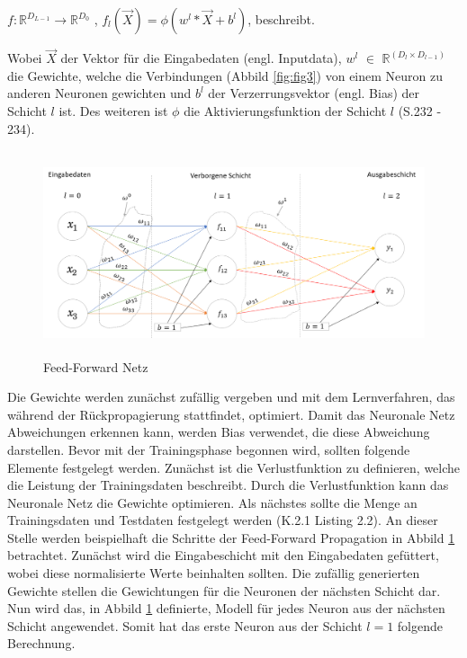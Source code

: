 \documentclass[12pt]{scrreprt}
\begin{document}
\begin{center}
	$f: \mathbb{R}^{D_{L-1}} \to \mathbb{R}^{D_{0}}$ , $f_{l}(\overrightarrow{X}) = \phi (w^{l} * \overrightarrow{X} + b^{l} ) $, beschreibt.
\end{center}

Wobei $\overrightarrow{X}$ der Vektor für die Eingabedaten (engl. Inputdata), $w^{l}$ $\in$ $\mathbb{R}^{(D_{l} \times D_{l-1})}$ die Gewichte, welche die Verbindungen (Abbild \ref{fig:fig3}) von einem Neuron zu anderen Neuronen gewichten und $b^{l}$ der Verzerrungsvektor (engl. Bias) der Schicht $l$ ist. Des weiteren ist $\phi$ die Aktivierungsfunktion der Schicht $l$ \cite{Plaue2021} (S.232 - 234).
	

	
\begin{figure}[h!]
	\centering
	\includegraphics[width=15cm,height=6cm]{FF_Netz.png}
	\caption{Feed-Forward Netz \cite{Halil2022}}
	\label{fig:fig10}
\end{figure}

Die Gewichte werden zunächst zufällig vergeben und mit dem Lernverfahren, das während der Rückpropagierung stattfindet, optimiert. Damit das Neuronale Netz Abweichungen erkennen kann, werden Bias verwendet, die diese Abweichung darstellen. Bevor mit der   Trainingsphase begonnen wird, sollten folgende Elemente festgelegt werden. Zunächst ist die Verlustfunktion zu definieren, welche die Leistung der Trainingsdaten beschreibt. Durch die Verlustfunktion kann das Neuronale Netz die Gewichte optimieren. Als nächstes sollte die Menge an Trainingsdaten und Testdaten festgelegt werden \cite{Chollet2018} (K.2.1 Listing 2.2). An dieser Stelle werden beispielhaft die Schritte der Feed-Forward Propagation in Abbild \ref{fig:fig10} betrachtet. Zunächst wird die Eingabeschicht mit den Eingabedaten gefüttert, wobei diese normalisierte Werte beinhalten sollten. Die zufällig generierten Gewichte stellen die Gewichtungen für die Neuronen der nächsten Schicht dar. Nun wird das, in Abbild \ref{fig:fig10} definierte, Modell für jedes Neuron aus der nächsten Schicht angewendet. Somit hat das erste Neuron aus der Schicht $l=1$  folgende Berechnung. 
	
\end{document}
